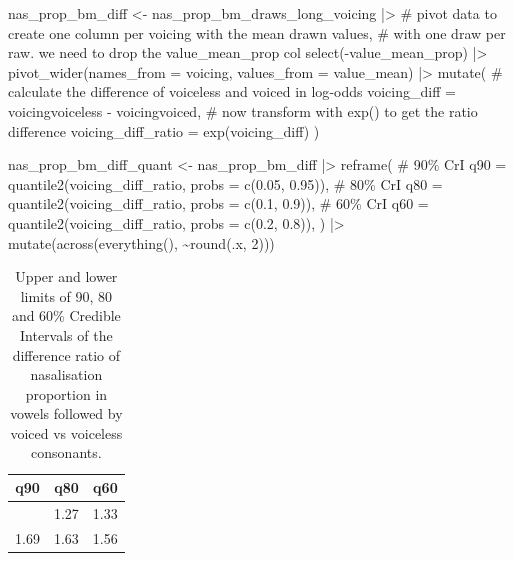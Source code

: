 \documentclass[
  authoryear,
  preprint,
  3p]{elsarticle}
\newenvironment{Shaded}{\begin{snugshade}}{\end{snugshade}}
\newcommand{\AttributeTok}[1]{\textcolor[rgb]{0.40,0.45,0.13}{#1}}
\newcommand{\CommentTok}[1]{\textcolor[rgb]{0.37,0.37,0.37}{#1}}
\newcommand{\DecValTok}[1]{\textcolor[rgb]{0.68,0.00,0.00}{#1}}
\newcommand{\FloatTok}[1]{\textcolor[rgb]{0.68,0.00,0.00}{#1}}
\newcommand{\FunctionTok}[1]{\textcolor[rgb]{0.28,0.35,0.67}{#1}}
\newcommand{\NormalTok}[1]{\textcolor[rgb]{0.00,0.23,0.31}{#1}}
\newcommand{\OtherTok}[1]{\textcolor[rgb]{0.00,0.23,0.31}{#1}}
\newcommand{\SpecialCharTok}[1]{\textcolor[rgb]{0.37,0.37,0.37}{#1}}
\begin{document}
\begin{Shaded}
\begin{Highlighting}[]
\NormalTok{nas\_prop\_bm\_diff }\OtherTok{\textless{}{-}}\NormalTok{ nas\_prop\_bm\_draws\_long\_voicing }\SpecialCharTok{|\textgreater{}} 
  \CommentTok{\# pivot data to create one column per voicing with the mean drawn values,}
  \CommentTok{\# with one draw per raw. we need to drop the value\_mean\_prop col}
  \FunctionTok{select}\NormalTok{(}\SpecialCharTok{{-}}\NormalTok{value\_mean\_prop) }\SpecialCharTok{|\textgreater{}} 
  \FunctionTok{pivot\_wider}\NormalTok{(}\AttributeTok{names\_from =}\NormalTok{ voicing, }\AttributeTok{values\_from =}\NormalTok{ value\_mean) }\SpecialCharTok{|\textgreater{}} 
  \FunctionTok{mutate}\NormalTok{(}
    \CommentTok{\# calculate the difference of voiceless and voiced in log{-}odds}
    \AttributeTok{voicing\_diff =}\NormalTok{ voicingvoiceless }\SpecialCharTok{{-}}\NormalTok{ voicingvoiced,}
    \CommentTok{\# now transform with exp() to get the ratio difference}
    \AttributeTok{voicing\_diff\_ratio =} \FunctionTok{exp}\NormalTok{(voicing\_diff)}
\NormalTok{  )}

\NormalTok{nas\_prop\_bm\_diff\_quant }\OtherTok{\textless{}{-}}\NormalTok{ nas\_prop\_bm\_diff }\SpecialCharTok{|\textgreater{}} 
  \FunctionTok{reframe}\NormalTok{(}
    \CommentTok{\# 90\% CrI}
    \AttributeTok{q90 =} \FunctionTok{quantile2}\NormalTok{(voicing\_diff\_ratio, }\AttributeTok{probs =} \FunctionTok{c}\NormalTok{(}\FloatTok{0.05}\NormalTok{, }\FloatTok{0.95}\NormalTok{)),}
    \CommentTok{\# 80\% CrI}
    \AttributeTok{q80 =} \FunctionTok{quantile2}\NormalTok{(voicing\_diff\_ratio, }\AttributeTok{probs =} \FunctionTok{c}\NormalTok{(}\FloatTok{0.1}\NormalTok{, }\FloatTok{0.9}\NormalTok{)),}
    \CommentTok{\# 60\% CrI}
    \AttributeTok{q60 =} \FunctionTok{quantile2}\NormalTok{(voicing\_diff\_ratio, }\AttributeTok{probs =} \FunctionTok{c}\NormalTok{(}\FloatTok{0.2}\NormalTok{, }\FloatTok{0.8}\NormalTok{)),}
\NormalTok{  ) }\SpecialCharTok{|\textgreater{}} 
  \FunctionTok{mutate}\NormalTok{(}\FunctionTok{across}\NormalTok{(}\FunctionTok{everything}\NormalTok{(), }\SpecialCharTok{\textasciitilde{}}\FunctionTok{round}\NormalTok{(.x, }\DecValTok{2}\NormalTok{)))}
\end{Highlighting}
\end{Shaded}

\begin{longtable}[]{@{}rrr@{}}

\caption{\label{tbl-nas-prop-bm-diff-quant}Upper and lower limits of 90,
80 and 60\% Credible Intervals of the difference ratio of nasalisation
proportion in vowels followed by voiced vs voiceless consonants.}

\tabularnewline

\toprule\noalign{}
q90 & q80 & q60 \\
\midrule\noalign{}
\endhead
\bottomrule\noalign{}
\endlastfoot
1.23 & 1.27 & 1.33 \\
1.69 & 1.63 & 1.56 \\

\end{longtable}
\end{document}
